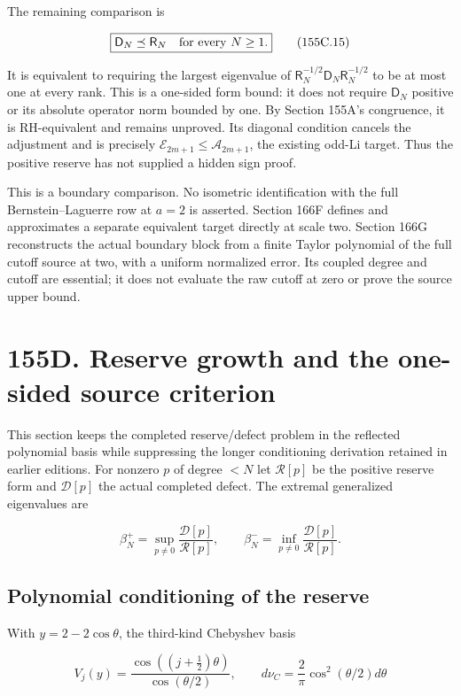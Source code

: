 \documentclass[
  11pt,
]{book}
\begin{document}
The remaining comparison is

\[
\boxed{\mathsf D_N\preceq\mathsf R_N\quad\hbox{for every }N\ge1.}
\tag{155C.15}
\]

It is equivalent to requiring the largest eigenvalue of
\(\mathsf R_N^{-1/2}\mathsf D_N\mathsf R_N^{-1/2}\) to be at most one at
every rank. This is a one-sided form bound: it does not require
\(\mathsf D_N\) positive or its absolute operator norm bounded by one.
By Section 155A's congruence, it is RH-equivalent and remains unproved.
Its diagonal condition cancels the adjustment and is precisely
\(\mathcal E_{2m+1}\le\mathcal A_{2m+1}\), the existing odd-Li target.
Thus the positive reserve has not supplied a hidden sign proof.

This is a boundary comparison. No isometric identification with the full
Bernstein--Laguerre row at \(a=2\) is asserted. Section 166F defines and
approximates a separate equivalent target directly at scale two. Section
166G reconstructs the actual boundary block from a finite Taylor
polynomial of the full cutoff source at two, with a uniform normalized
error. Its coupled degree and cutoff are essential; it does not evaluate
the raw cutoff at zero or prove the source upper bound.

\section{155D. Reserve growth and the one-sided source
criterion}\label{d.-reserve-growth-and-the-one-sided-source-criterion}

This section keeps the completed reserve/defect problem in the reflected
polynomial basis while suppressing the longer conditioning derivation
retained in earlier editions. For nonzero \(p\) of degree \(<N\) let
\(\mathcal R[p]\) be the positive reserve form and \(\mathcal D[p]\) the
actual completed defect. The extremal generalized eigenvalues are

\[
\beta_N^+=\sup_{p\ne0}\frac{\mathcal D[p]}{\mathcal R[p]},\qquad
\beta_N^-=\inf_{p\ne0}\frac{\mathcal D[p]}{\mathcal R[p]}.
\tag{155D.2}
\]

\subsection{Polynomial conditioning of the
reserve}\label{polynomial-conditioning-of-the-reserve}

With \(y=2-2\cos\theta\), the third-kind Chebyshev basis

\[
V_j(y)=\frac{\cos((j+\tfrac12)\theta)}{\cos(\theta/2)},
\qquad d\nu_C=\frac2\pi\cos^2(\theta/2)d\theta
\tag{155D.4}
\]
\end{document}
